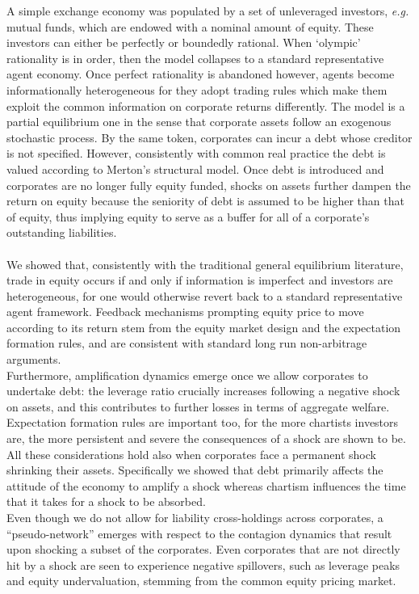 \documentclass[11pt]{article}
\begin{document}
A simple exchange economy was populated by a set of unleveraged investors, \emph{e.g.} mutual funds, which are endowed with a nominal amount of equity. These investors can either be perfectly or boundedly rational. When `olympic' rationality is in order, then the model collapses to a standard representative agent economy. Once perfect rationality is abandoned however, agents become informationally heterogeneous for they adopt trading rules which make them exploit the common information on corporate returns differently. The model is a partial equilibrium one in the sense that corporate assets follow an exogenous stochastic process. By the same token, corporates can incur a debt whose creditor is not specified. However, consistently with common real practice the debt is valued according to Merton's structural model. Once debt is introduced and corporates are no longer fully equity funded, shocks on assets further dampen the return on equity because the seniority of debt is assumed to be higher than that of equity, thus implying equity to serve as a buffer for all of a corporate's outstanding liabilities.\\\\
We showed that, consistently with the traditional general equilibrium literature, trade in equity occurs if and only if information is imperfect and investors are heterogeneous, for one would otherwise revert back to a standard representative agent framework. Feedback mechanisms prompting equity price to move according to its return stem from the equity market design and the expectation formation rules, and are consistent with standard  long run non-arbitrage arguments.\\ Furthermore, amplification dynamics emerge once we allow corporates to undertake debt: the leverage ratio crucially increases following a negative shock on assets, and this contributes to further losses in terms of aggregate welfare. Expectation formation rules are important too, for the more chartists investors are, the more persistent and severe the consequences of a shock are shown to be. All these considerations hold also when corporates face a permanent shock shrinking their assets. Specifically we showed that debt primarily affects the attitude of the economy to amplify a shock whereas chartism influences the time that it takes for a shock to be absorbed.\\
Even though we do not allow for liability cross-holdings across corporates, a ``pseudo-network'' emerges with respect to the contagion dynamics that result upon shocking a subset of the corporates. Even corporates that are not directly hit by a shock are seen to experience negative spillovers, such as leverage peaks and equity undervaluation, stemming from the common equity pricing market.\\\\
\end{document}
